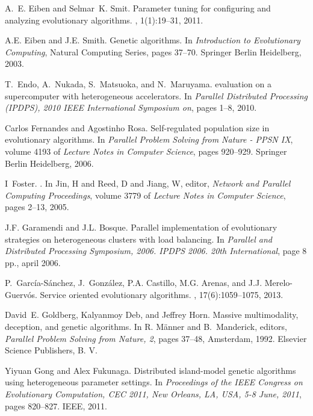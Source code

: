 \documentclass[final,1p,times]{elsarticle}
\begin{document}
\begin{thebibliography}{10}
A.~E. Eiben and Selmar~K. Smit.
\newblock Parameter tuning for configuring and analyzing evolutionary
  algorithms.
, 1(1):19--31, 2011.

A.E. Eiben and J.E. Smith.
\newblock Genetic algorithms.
\newblock In {\em Introduction to Evolutionary Computing}, Natural Computing
  Series, pages 37--70. Springer Berlin Heidelberg, 2003.

T.~Endo, A.~Nukada, S.~Matsuoka, and N.~Maruyama.
 evaluation on a supercomputer with heterogeneous
  accelerators.
\newblock In {\em Parallel Distributed Processing (IPDPS), 2010 IEEE
  International Symposium on}, pages 1--8, 2010.

Carlos Fernandes and Agostinho Rosa.
\newblock Self-regulated population size in evolutionary algorithms.
\newblock In {\em Parallel Problem Solving from Nature - PPSN IX}, volume 4193
  of {\em Lecture Notes in Computer Science}, pages 920--929. Springer Berlin
  Heidelberg, 2006.

I~Foster.
.
\newblock In {Jin, H and Reed, D and Jiang, W}, editor, {\em {Network and
  Parallel Computing Proceedings}}, volume {3779} of {\em {Lecture Notes in
  Computer Science}}, pages {2--13}, 2005.

J.F. Garamendi and J.L. Bosque.
\newblock Parallel implementation of evolutionary strategies on heterogeneous
  clusters with load balancing.
\newblock In {\em Parallel and Distributed Processing Symposium, 2006. IPDPS
  2006. 20th International}, page 8 pp., april 2006.

P.~Garc{\'i}a-S{\'a}nchez, J.~Gonz{\'a}lez, P.A. Castillo, M.G. Arenas, and
  J.J. Merelo-Guerv{\'o}s.
\newblock Service oriented evolutionary algorithms.
, 17(6):1059--1075, 2013.

David~E. Goldberg, Kalyanmoy Deb, and Jeffrey Horn.
\newblock Massive multimodality, deception, and genetic algorithms.
\newblock In {R. M\"{a}nner} and B.~Manderick, editors, {\em Parallel Problem
  Solving from Nature, 2}, pages 37--48, Amsterdam, 1992. Elsevier Science
  Publishers, B. V.

Yiyuan Gong and Alex Fukunaga.
\newblock Distributed island-model genetic algorithms using heterogeneous
  parameter settings.
\newblock In {\em Proceedings of the IEEE Congress on Evolutionary Computation,
  CEC 2011, New Orleans, LA, USA, 5-8 June, 2011}, pages 820--827. IEEE, 2011.


\end{thebibliography}
\end{document}
